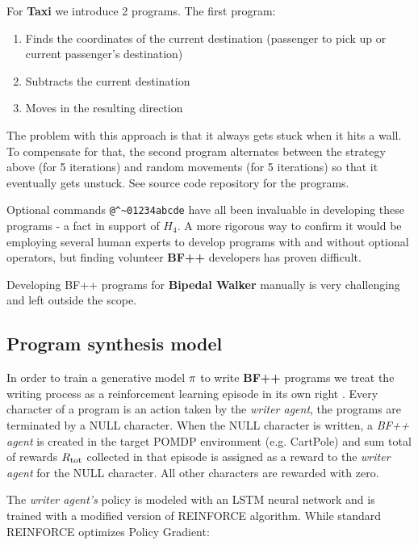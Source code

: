 For \textbf{Taxi} we introduce 2 programs.
The first program:
\begin{enumerate}
    \item Finds the coordinates of the current destination (passenger to pick up or current passenger's destination)
    \item Subtracts the current destination 
    \item Moves in the resulting direction
\end{enumerate}

The problem with this approach is that it always gets stuck when it hits a wall.
To compensate for that, the second program alternates between the strategy above (for 5 iterations) and random movements (for 5 iterations) so that it eventually gets unstuck. See source code repository for the programs.

Optional commands \verb|@^~01234abcde| have all been invaluable in developing these programs - a fact in support of $H_4$.
A more rigorous way to confirm it would be employing several human experts to develop programs with and without optional operators, but finding volunteer \textbf{BF++} developers has proven difficult. 

Developing BF++ programs for \textbf{Bipedal Walker} manually is very challenging and left outside the scope.

\subsection{Program synthesis model}

In order to train a generative model $\pi$ to write \textbf{BF++} programs we treat the writing process as a reinforcement learning episode in its own right \cite{abolafiaNeuralProgramSynthesis2018} .
Every character of a program is an action taken by the \emph{writer agent}, the programs are terminated by a NULL character.
When the NULL character is written, a \emph{BF++ agent} is created in the target POMDP environment (e.g. CartPole) and sum total of rewards $R_\text{tot}$ collected in that episode is assigned as a reward to the \emph{writer agent} for the NULL character.
All other characters are rewarded with zero.

The \emph{writer agent's} policy is modeled with an LSTM \cite{hochreiterLongShorttermMemory1997} neural network and is trained with a modified version of REINFORCE \cite{williamsSimpleStatisticalGradientfollowing1992}algorithm.
While standard REINFORCE optimizes Policy Gradient:


